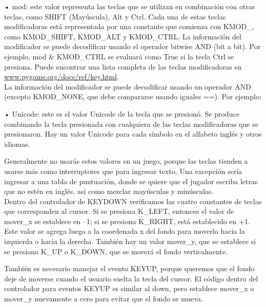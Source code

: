 • mod: este valor representa las teclas que se utilizan en combinación con otras teclas, como
 {\ttfamily SHIFT} (Mayúscula),  {\ttfamily Alt} y  {\ttfamily Ctrl}. Cada una de estas teclas modificadoras está representada por una constante que comienza con {\ttfamily  KMOD\_}, como {\ttfamily  KMOD\_SHIFT}, {\ttfamily  KMOD\_ALT} y {\ttfamily  KMOD\_CTRL}. 
La información del modificador se puede decodificar usando el operador bitwise {\ttfamily  AND} (bit a bit). Por ejemplo,  {\ttfamily mod} \&  {\ttfamily KMOD\_CTRL} se evaluará como  {\ttfamily True} si la tecla  {\ttfamily Ctrl} se presiona.  Puede encontrar una lista completa de las teclas modificadoras en  \href{www.pygame.org/docs/ref/key.html}{\color{vino}www.pygame.org/docs/ref/key.html}.\\

La información del modificador se puede decodificar usando un operador  {\ttfamily  AND} (excepto KMOD\_NONE, que debe compararse usando iguales ==). Por ejemplo:


• Unicode: este es el valor Unicode de la tecla que se presionó. Se produce combinando
la tecla presionada con cualquiera de las teclas modificadoras que se presionaron. Hay un valor  Unicode
para cada símbolo en el alfabeto inglés y otros idiomas. 

Generalmente no usarás estos valores en un juego, porque las teclas tienden a usarse más como interruptores que para ingresar
texto. Una excepción sería ingresar a una tabla de puntuación, donde se quiere que el jugador  escriba
letras que no estén en inglés, así como mezclar mayúsculas y minúsculas.\\
 
 
Dentro del controlador de {\ttfamily KEYDOWN} verificamos las cuatro  constantes  de teclas que corresponden al
cursor. Si se presiona {\ttfamily K\_LEFT}, entonces el valor de {\ttfamily mover\_x} se establece en –1; 
si se presiona {\ttfamily K\_RIGHT}, está establecido en +1. Este valor se agrega luego a la coordenada x del fondo 
para moverlo hacia la izquierda o hacia la derecha. También hay un valor {\ttfamily mover\_y}, que se establece si se presiona {\ttfamily K\_UP} o {\ttfamily K\_DOWN}, que se moverá el fondo verticalmente.

 
También es necesario manejar el evento {\ttfamily KEYUP}, porque queremos que el fondo deje de moverse cuando el usuario 
suelta la tecla del cursor. El código dentro del controlador para eventos {\ttfamily  KEYUP} es similar al {\ttfamily down}, 
pero establece  {\ttfamily mover\_x} o {\ttfamily mover\_y} nuevamente a cero para evitar que el fondo se mueva.\\


